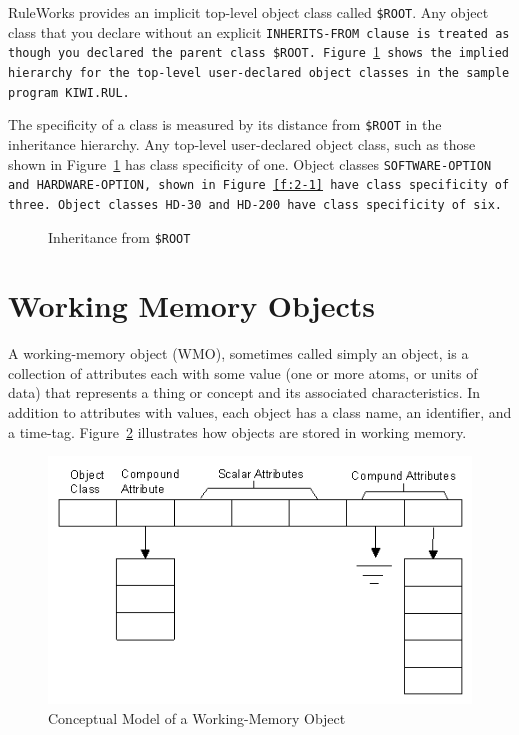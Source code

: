 RuleWorks provides an implicit top-level object class called
\verb|$ROOT|. Any object class that you declare without an explicit
\tt{INHERITS-FROM} clause is treated as though you declared the parent
class \verb|$ROOT|. Figure~\ref{f:2-2} shows the implied hierarchy for
the top-level user-declared object classes in the sample program
\tt{KIWI.RUL}.

The specificity of a class is measured by its distance from
\verb|$ROOT| in the inheritance hierarchy. Any top-level user-declared
object class, such as those shown in Figure~\ref{f:2-2} has class specificity
of one. Object classes \tt{SOFTWARE-OPTION} and \tt{HARDWARE-OPTION},
shown in Figure~\ref{f:2-1} have class specificity of three. Object
classes \tt{HD-30} and \tt{HD-200} have class specificity of six.

\begin{figure}[h]
  \centering
  
  \caption{Inheritance from \tt{\$ROOT}}
  \label{f:2-2}
\end{figure}

\section{Working Memory Objects}

A working-memory object (WMO), sometimes called simply an
object, is a collection of attributes each with some value
(one or more atoms, or units of data) that represents a thing
or concept and its associated characteristics. In addition to
attributes with values, each object has a class name, an
identifier, and a time-tag. Figure~\ref{f:2-3} illustrates how
objects are stored in working memory.

\begin{figure}[h]
  \centering
  \includegraphics[scale=0.7]{f2-3}
  \caption{Conceptual Model of a Working-Memory Object}
  \label{f:2-3}
\end{figure}

